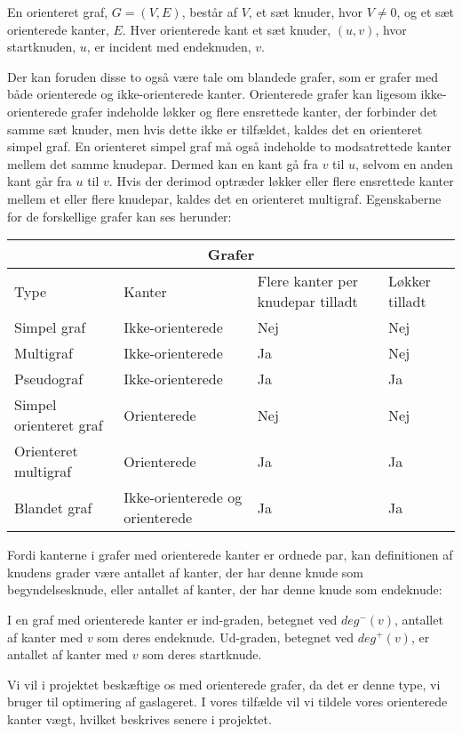\begin{defn}
En orienteret graf, $G=(V,E)$, består af $V$, et sæt knuder, hvor $V\neq0$, og et sæt orienterede kanter, $E$. Hver orienterede kant et sæt knuder, $(u,v)$, hvor startknuden, $u$, er incident med endeknuden, $v$. 
\end{defn}





Der kan foruden disse to også være tale om blandede grafer, som er grafer med både orienterede og ikke-orienterede kanter. Orienterede grafer kan ligesom ikke-orienterede grafer indeholde løkker og flere ensrettede kanter, der forbinder det samme sæt knuder, men hvis dette ikke er tilfældet, kaldes det en orienteret simpel graf. En orienteret simpel graf må også indeholde to modsatrettede kanter mellem det samme knudepar. Dermed kan en kant gå fra $v$ til $u$, selvom en anden kant går fra $u$ til $v$. Hvis der derimod optræder løkker eller flere ensrettede kanter mellem et eller flere knudepar, kaldes det en orienteret multigraf. Egenskaberne for de forskellige grafer kan ses herunder:

\begin{center}
\begin{tabular}{ |p{4cm}|p{3cm}|p{3cm}|p{2cm}|  }
 \hline
 \multicolumn{4}{|c|}{Grafer} \\
 \hline
 Type & Kanter & Flere kanter per knudepar tilladt & Løkker tilladt\\
 \hline
 Simpel graf   & Ikke-orienterede    & Nej &   Nej\\
 Multigraf &   Ikke-orienterede & Ja   & Nej\\
 Pseudograf & Ikke-orienterede & Ja &  Ja\\
 Simpel orienteret graf    & Orienterede & Nej &  Nej\\
 Orienteret multigraf &  Orienterede  & Ja & Ja\\
 Blandet graf & Ikke-orienterede og orienterede  & Ja   & Ja\\
 \hline
\end{tabular}
\end{center}

Fordi kanterne i grafer med orienterede kanter er ordnede par, kan definitionen af knudens grader være antallet af kanter, der har denne knude som begyndelsesknude, eller antallet af kanter, der har denne knude som endeknude:
\begin{defn}
I en graf med orienterede kanter er ind-graden, betegnet ved $deg^{-}(v)$, antallet af kanter med $v$ som deres endeknude. Ud-graden, betegnet ved $deg^{+}(v)$, er antallet af kanter med $v$ som deres startknude.
\end{defn}
Vi vil i projektet beskæftige os med orienterede grafer, da det er denne type, vi bruger til optimering af gaslageret. I vores tilfælde vil vi tildele vores orienterede kanter vægt, hvilket beskrives senere i projektet.
